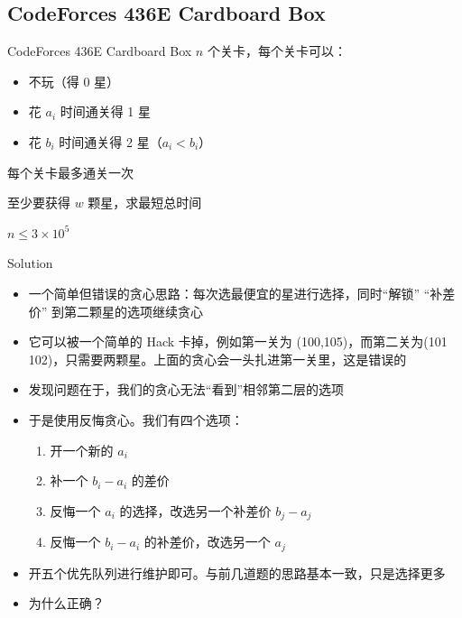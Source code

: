 ﻿\documentclass[aspectratio=169,handout]{ctexbeamer}
\begin{document}
\subsection{CodeForces 436E Cardboard Box}
\begin{frame}{CodeForces 436E Cardboard Box}
    $n$ 个关卡，每个关卡可以：

\begin{itemize}
    \item 不玩（得 0 星）
    \item 花 $a_i$ 时间通关得 1 星
    \item 花 $b_i$ 时间通关得 2 星（$a_i<b_i$）
\end{itemize}

每个关卡最多通关一次

至少要获得 $w$ 颗星，求最短总时间

$n\leq 3\times 10^5$
\end{frame}

\begin{frame}{Solution}
    \begin{itemize}
        \item 一个简单但错误的贪心思路：每次选最便宜的星进行选择，同时“解锁” “补差价” 到第二颗星的选项继续贪心
        \pause
        \item 它可以被一个简单的 Hack 卡掉，例如第一关为 (100,105)，而第二关为(101 102)，只需要两颗星。上面的贪心会一头扎进第一关里，这是错误的
        \item 发现问题在于，我们的贪心无法“看到”相邻第二层的选项
        \pause
        \item 于是使用反悔贪心。我们有四个选项：
        \begin{enumerate}
            \item 开一个新的 $a_i$
            \item 补一个 $b_i-a_i$ 的差价
            \item 反悔一个 $a_i$ 的选择，改选另一个补差价 $b_j-a_j$
            \item 反悔一个 $b_i-a_i$ 的补差价，改选另一个 $a_j$
        \end{enumerate}
        \pause
        \item 开五个优先队列进行维护即可。与前几道题的思路基本一致，只是选择更多
        \item 为什么正确？
    \end{itemize}
\end{frame}
\end{document}

